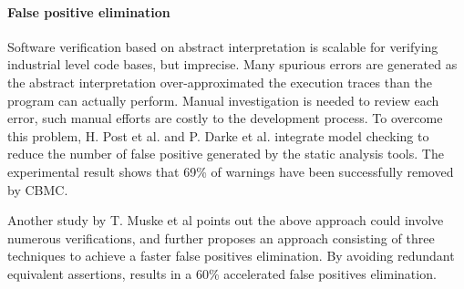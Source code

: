 



\paragraph{False positive elimination}
Software verification based on abstract interpretation is scalable for verifying industrial level code bases, but imprecise. Many spurious errors are generated as the abstract interpretation over-approximated the execution traces than the program can actually perform. Manual investigation is needed to review each error, such manual efforts are costly to the development process. To overcome this problem, 
H. Post et al. \cite{4639322} and P. Darke et al. \cite{Kumar:2013:PRA:2491411.2494569} integrate model checking to reduce the number of false positive generated by the static analysis tools. The experimental result shows that 69\% of warnings have been successfully removed by CBMC. 


Another study by T. Muske et al \cite{tukaram2013efficient} points out the above approach could involve numerous verifications, and further proposes an approach consisting of three techniques to achieve a faster false positives elimination. By avoiding redundant equivalent assertions, results in a 60\% accelerated false positives elimination. 

